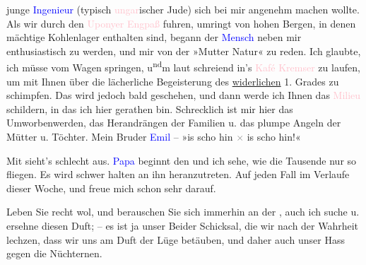                junge \textcolor{blue}{Ingenieur}{}\ledrightnote{{$\rightarrow$}\textcolor{blue}{?? [Ingenieur]}} (typisch
                  \textcolor{pink}{ungar}{}\ledrightnote{{$\rightarrow$}\textcolor{pink}{Ungarn}}ischer Jude) sich bei
               mir angenehm machen wollte. Als wir durch den \textcolor{pink}{Uponyer Engpaß}{}\ledrightnote{\textcolor{pink}{Upponyi-szoros}} fuhren, umringt von hohen Bergen, in denen mächtige
               Kohlenlager enthalten sind, be{\pb}gann der \textcolor{blue}{Mensch}{}\ledrightnote{{$\rightarrow$}\textcolor{blue}{?? [Ingenieur]}} neben mir
               enthusiastisch zu werden, und mir von der »Mutter Natur« zu reden. Ich glaubte, ich
               müsse vom Wagen springen, u\substVorne{}\textsuperscript{nd}\substDazwischen{}m\substHinten{} laut schreiend in’s \textcolor{pink}{Kafé Kremser}{}\ledrightnote{\textcolor{pink}{Café Kremser}} zu
               laufen, um mit Ihnen über die lächerliche Begeisterung des \uline{widerlichen} 1. Grades zu schimpfen. Das wird jedoch bald geschehen, und dann
               werde ich Ihnen das \textcolor{pink}{Milieu}{}\ledrightnote{{$\rightarrow$}\textcolor{pink}{Miskolc}}
               schildern, in das ich hier gerathen bin. Schrecklich ist mir hier das Umworbenwerden,
               das Herandrängen der Familien u. das plumpe Angeln der Mütter u. Töchter. Mein Bruder
                  \textcolor{blue}{Emil}{}\ledrightnote{\textcolor{blue}{Michael Emil Salzmann}} – »is scho hin \textcolor{gray}{×} is scho hin!«\pend
           
\pstart
           Mit \label{K_L03105-4v}\label{K_L03105-4h} sieht's schlecht aus. \textcolor{blue}{Papa}{}\ledrightnote{\textcolor{blue}{Philipp Salzmann}} beginnt
               den \label{K_L03105-5v}\label{K_L03105-5h} und
               ich sehe, wie die Tausende nur so fliegen. Es wird schwer halten an ihn
               heranzutreten. Auf jeden Fall \label{K_L03105-6v}\label{K_L03105-6h} im Verlaufe dieser Woche, und freue mich schon sehr darauf.\pend
           
\pstart
           Leben Sie recht wol, und berauschen Sie sich immerhin an der \label{K_L03105-7v}\label{K_L03105-7h}, auch ich suche u. ersehne diesen Duft; – es ist ja unser Beider Schicksal,
               die wir nach der Wahrheit lechzen, dass wir uns am Duft der Lüge betäuben, und daher
               auch unser Hass gegen die Nüchternen.\pend
           
